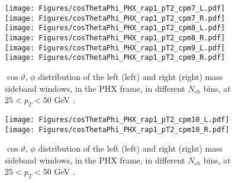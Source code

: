 \documentclass[12pt]{article}
\begin{document}
\begin{figure}[htbp]
\centering
\texttt{[image: Figures/cosThetaPhi\_PHX\_rap1\_pT2\_cpm7\_L.pdf]}
\texttt{[image: Figures/cosThetaPhi\_PHX\_rap1\_pT2\_cpm7\_R.pdf]}
\texttt{[image: Figures/cosThetaPhi\_PHX\_rap1\_pT2\_cpm8\_L.pdf]}
\texttt{[image: Figures/cosThetaPhi\_PHX\_rap1\_pT2\_cpm8\_R.pdf]}
\texttt{[image: Figures/cosThetaPhi\_PHX\_rap1\_pT2\_cpm9\_L.pdf]}
\texttt{[image: Figures/cosThetaPhi\_PHX\_rap1\_pT2\_cpm9\_R.pdf]}
\caption{$\cos\vartheta,\,\phi$ distribution of the left (left) and
  right (right) mass sideband windows, in the PHX frame, in different
  $N_{ch}$ bins, at $25 < p_{T} < 50$ GeV .}
\end{figure}
\clearpage

\begin{figure}[htbp]
\centering
\texttt{[image: Figures/cosThetaPhi\_PHX\_rap1\_pT2\_cpm10\_L.pdf]}
\texttt{[image: Figures/cosThetaPhi\_PHX\_rap1\_pT2\_cpm10\_R.pdf]}
\caption{$\cos\vartheta,\,\phi$ distribution of the left (left) and
  right (right) mass sideband windows, in the PHX frame, in different
  $N_{ch}$ bins, at $25 < p_{T} < 50$ GeV .}
\end{figure}
\clearpage
\end{document}
